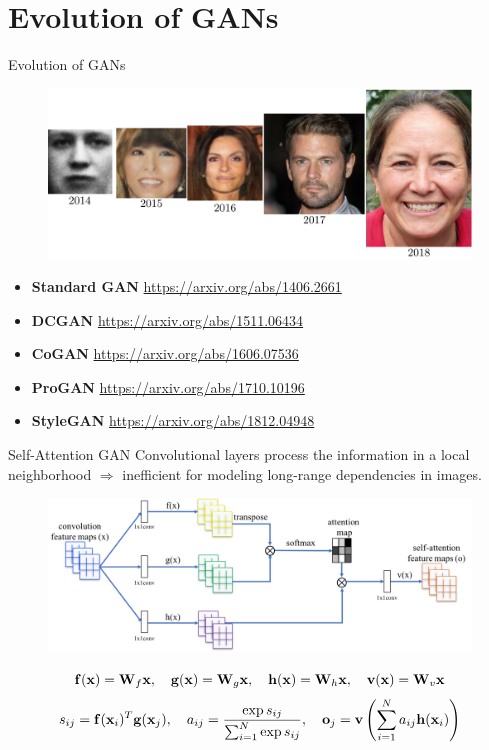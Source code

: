 \section{Evolution of GANs}
\begin{frame}{Evolution of GANs}
	\begin{figure}
		\centering
		\includegraphics[width=\linewidth]{figs/gan_evolution}
	\end{figure}
	\begin{itemize}
		\item \textbf{Standard GAN} \href{https://arxiv.org/abs/1406.2661}{https://arxiv.org/abs/1406.2661}
		\item \textbf{DCGAN} \href{https://arxiv.org/abs/1511.06434}{https://arxiv.org/abs/1511.06434}
		\item \textbf{CoGAN} \href{https://arxiv.org/abs/1606.07536}{https://arxiv.org/abs/1606.07536}
		\item \textbf{ProGAN} \href{https://arxiv.org/abs/1710.10196}{https://arxiv.org/abs/1710.10196} 
		\item \textbf{StyleGAN} \href{https://arxiv.org/abs/1812.04948}{https://arxiv.org/abs/1812.04948}
	\end{itemize}
\end{frame}
\begin{frame}{Self-Attention GAN}
	Convolutional layers process the information in a local neighborhood $\Rightarrow$ inefficient for modeling long-range dependencies in images.
	\vspace{-0.3cm}
	\begin{figure}
		\centering
		\includegraphics[width=0.9\linewidth]{figs/self-attention}
	\end{figure}
	\[
		\mathbf{f}(\mathbf{x}) = \mathbf{W}_f \mathbf{x}, \quad \mathbf{g}(\mathbf{x}) = \mathbf{W}_g\mathbf{x}, \quad \mathbf{h} (\mathbf{x}) = \mathbf{W}_h\mathbf{x}, \quad \mathbf{v}(\mathbf{x}) = \mathbf{W}_v\mathbf{x}
	\]
	\[
		s_{ij} = \mathbf{f}(\mathbf{x}_i)^T \mathbf{g}(\mathbf{x}_j), \quad a_{ij} = \frac{\exp{s_{ij}}}{\sum_{i=1}^N \exp{s_{ij}}}, \quad \textbf{o}_j = \textbf{v}\left( \sum_{i=1}^N a_{ij} \mathbf{h}(\mathbf{x}_i) \right)
	\]
\end{frame}
